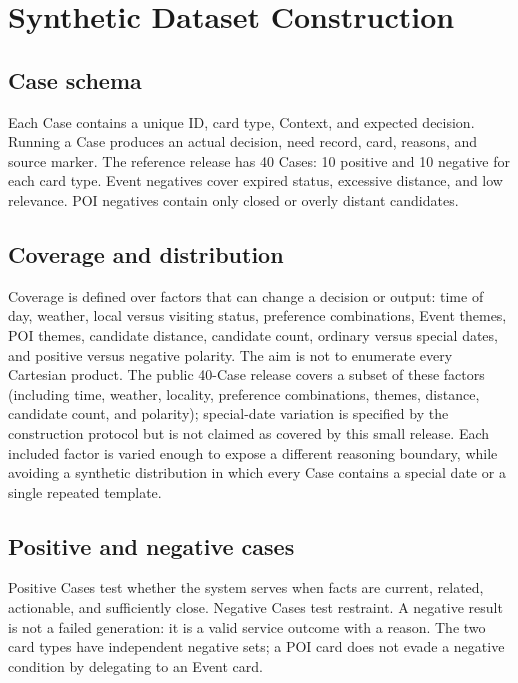 \documentclass[10pt]{article}
\begin{document}
\section{Synthetic Dataset Construction}

\subsection{Case schema}

Each Case contains a unique ID, card type, Context, and expected decision. Running a Case produces an actual decision, need record, card, reasons, and source marker. The reference release has 40 Cases: 10 positive and 10 negative for each card type. Event negatives cover expired status, excessive distance, and low relevance. POI negatives contain only closed or overly distant candidates.

\subsection{Coverage and distribution}

Coverage is defined over factors that can change a decision or output: time of day, weather, local versus visiting status, preference combinations, Event themes, POI themes, candidate distance, candidate count, ordinary versus special dates, and positive versus negative polarity. The aim is not to enumerate every Cartesian product. The public 40-Case release covers a subset of these factors (including time, weather, locality, preference combinations, themes, distance, candidate count, and polarity); special-date variation is specified by the construction protocol but is not claimed as covered by this small release. Each included factor is varied enough to expose a different reasoning boundary, while avoiding a synthetic distribution in which every Case contains a special date or a single repeated template.

\subsection{Positive and negative cases}

Positive Cases test whether the system serves when facts are current, related, actionable, and sufficiently close. Negative Cases test restraint. A negative result is not a failed generation: it is a valid service outcome with a reason. The two card types have independent negative sets; a POI card does not evade a negative condition by delegating to an Event card.
\end{document}
